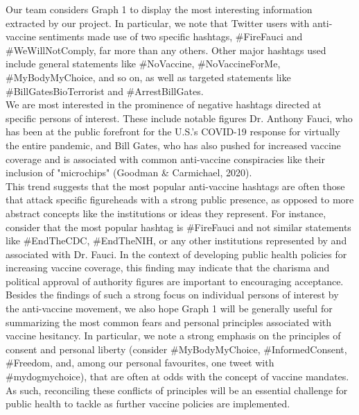 \documentclass[fontsize=11pt]{article}
\begin{document}
Our team considers Graph 1 to display the most interesting information extracted by our project. In particular, we note that Twitter users with anti-vaccine sentiments made use of two specific hashtags, #FireFauci and #WeWillNotComply, far more than any others. Other major hashtags used include general statements like #NoVaccine, #NoVaccineForMe, #MyBodyMyChoice, and so on, as well as targeted statements like #BillGatesBioTerrorist and #ArrestBillGates. \\

We are most interested in the prominence of negative hashtags directed at specific persons of interest. These include notable figures Dr. Anthony Fauci, who has been at the public forefront for the U.S.'s COVID-19 response for virtually the entire pandemic, and Bill Gates, who has also pushed for increased vaccine coverage and is associated with common anti-vaccine conspiracies like their inclusion of "microchips" (Goodman & Carmichael, 2020). \\

This trend suggests that the most popular anti-vaccine hashtags are often those that attack specific figureheads with a strong public presence, as opposed to more abstract concepts like the institutions or ideas they represent. For instance, consider that the most popular hashtag is #FireFauci and not similar statements like #EndTheCDC, #EndTheNIH, or any other institutions represented by and associated with Dr. Fauci. In the context of developing public health policies for increasing vaccine coverage, this finding may indicate that the charisma and political approval of authority figures are important to encouraging acceptance. \\

Besides the findings of such a strong focus on individual persons of interest by the anti-vaccine movement, we also hope Graph 1 will be generally useful for summarizing the most common fears and personal principles associated with vaccine hesitancy. In particular, we note a strong emphasis on the principles of consent and personal liberty (consider #MyBodyMyChoice, #InformedConsent, #Freedom, and, among our personal favourites, one tweet with #mydogmychoice), that are often at odds with the concept of vaccine mandates. As such, reconciling these conflicts of principles will be an essential challenge for public health to tackle as further vaccine policies are implemented. \\
\end{document}
